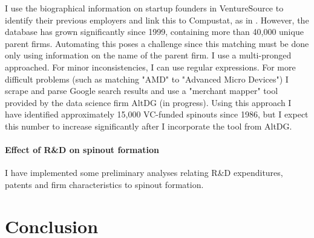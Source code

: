 \documentclass[11pt,english]{article}
\theoremstyle{remark}
\begin{document}
I use the biographical information on startup founders in VentureSource to identify their previous employers and link this to Compustat, as in \cite{gompers_entrepreneurial_2005}. However, the database has grown significantly since 1999, containing more than 40,000 unique parent firms. Automating this poses a challenge since this matching must be done only using information on the name of the parent firm. I use a multi-pronged approached. For minor inconsistencies, I can use regular expressions. For more difficult problems (such as matching "AMD" to "Advanced Micro Devices") I scrape and parse Google search results and use a "merchant mapper" tool provided by the data science firm AltDG (in progress). Using this approach I have identified approximately 15,000 VC-funded spinouts since 1986, but I expect this number to increase significantly after I incorporate the tool from AltDG.

\paragraph{Effect of R\&D on spinout formation}

I have implemented some preliminary analyses relating R\&D expenditures, patents and firm characteristics to spinout formation. 

\footnotesize
\centering




\section{Conclusion}

\small


\end{document}
